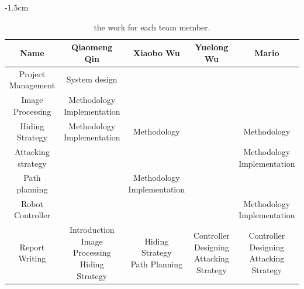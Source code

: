 \begin{table}[htbp]\footnotesize
\addtolength{\leftskip} {-1.5cm}
\begin{tabular}{c|cccc}
\hline 
Name&Qiaomeng Qin&Xiaobo Wu&Yuelong Wu&Mario\\
\hline 
Project Management&System design&&&  \\
\hline 
Image Processing&\makecell[c]{Methodology\\Implementation}& & &\\
\hline 
Hiding Strategy&\makecell[c]{Methodology\\Implementation}&Methodology& &Methodology\\
\hline 
Attacking strategy& & & &\makecell[c]{Methodology\\Implementation}\\
\hline 
Path planning& &\makecell[c]{Methodology\\Implementation}& &\\
\hline 
Robot Controller& & & &\makecell[c]{Methodology\\Implementation}\\
\hline 
Report Writing&\makecell[c]{Introduction\\Image Processing\\Hiding Strategy}&\makecell[c]{Hiding Strategy\\Path Planning}&\makecell[c]{Controller Designing\\Attacking Strategy}&\makecell[c]{Controller Designing\\Attacking Strategy}\\
\hline 
\end{tabular}
\caption[the work for each team member]{the work for each team member.}\label{teamwork}
\end{table}


